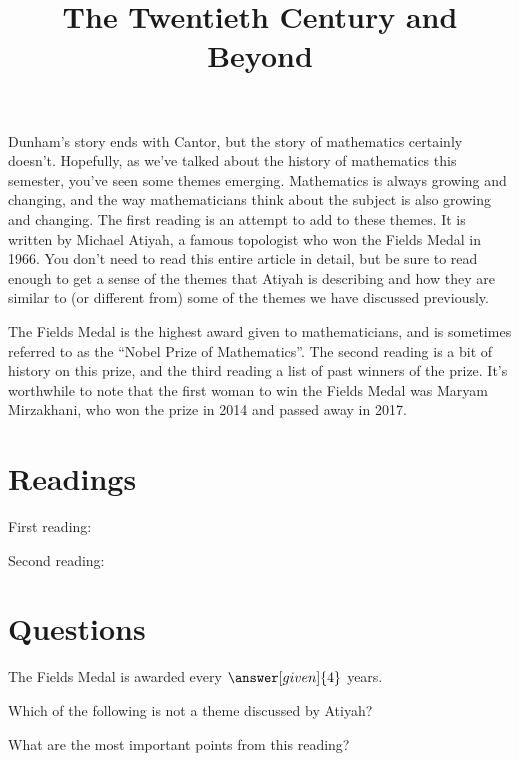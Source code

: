 \documentclass[nooutcomes]{ximera}
\title{The Twentieth Century and Beyond}
\begin{document}
\begin{abstract}
    
\end{abstract}
\maketitle

Dunham's story ends with Cantor, but the story of mathematics certainly doesn't.  Hopefully, as we've talked about the history of mathematics this semester, you've seen some themes emerging.  Mathematics is always growing and changing, and the way mathematicians think about the subject is also growing and changing.  The first reading is an attempt to add to these themes.  It is written by Michael Atiyah, a famous topologist who won the Fields Medal in 1966.  You don't need to read this entire article in detail, but be sure to read enough to get a sense of the themes that Atiyah is describing and how they are similar to (or different from) some of the themes we have discussed previously.

The Fields Medal is the highest award given to mathematicians, and is sometimes referred to as the ``Nobel Prize of Mathematics''.  The second reading is a bit of history on this prize, and the third reading a list of past winners of the prize.  It's worthwhile to note that the first woman to win the Fields Medal was Maryam Mirzakhani, who won the prize in 2014 and passed away in 2017.



\section{Readings}
First reading: 

Second reading: 





\section{Questions}

\begin{question}
The Fields Medal is awarded every $\answer[given]{4}$ years.
\end{question}

\begin{question}
Which of the following is not a theme discussed by Atiyah?
\begin{multipleChoice}
\end{multipleChoice}
\end{question}


\begin{question}
What are the most important points from this reading?
\begin{freeResponse}
\end{freeResponse}

\end{question}
\end{document}
